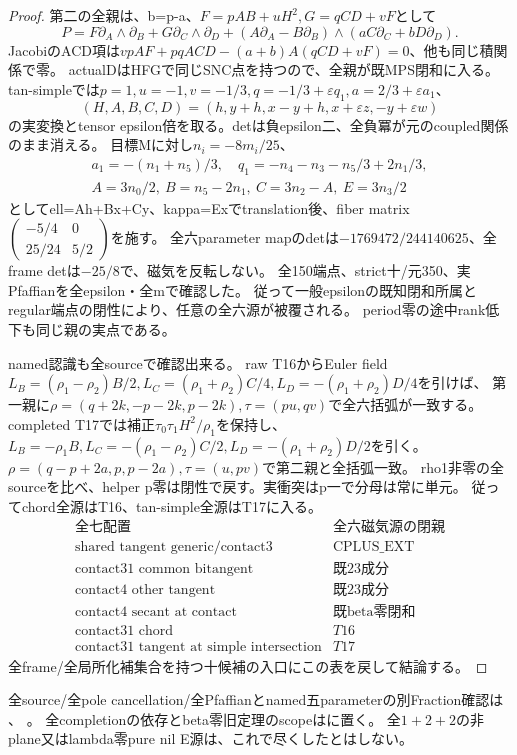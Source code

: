 \documentclass[a4paper,11pt]{ltjsarticle}
\theoremstyle{definition}
\begin{document}
\begin{proof}
第二の全親は、b=p-a、$F=pAB+uH^2,G=qCD+vF$として
\[
 P=F\partial_A\wedge\partial_B+G\partial_C\wedge\partial_D+
 (A\partial_A-B\partial_B)\wedge(aC\partial_C+bD\partial_D).
\]
JacobiのACD項は$vpAF+pqACD-(a+b)A(qCD+vF)=0$、他も同じ積関係で零。
actualDはHFGで同じSNC点を持つので、全親が既MPS閉和に入る。
tan-simpleでは$p=1,u=-1,v=-1/3,q=-1/3+\varepsilon q_1,a=2/3+\varepsilon a_1$、
\[
 (H,A,B,C,D)=(h,y+h,x-y+h,x+\varepsilon z,-y+\varepsilon w)
\]
の実変換とtensor epsilon倍を取る。detは負epsilon二、全負冪が元のcoupled関係のまま消える。
目標Mに対し$n_i=-8m_i/25$、
\[
\begin{gathered}
 a_1=-(n_1+n_5)/3,\quad q_1=-n_4-n_3-n_5/3+2n_1/3,\\
 A=3n_0/2,\ B=n_5-2n_1,\ C=3n_2-A,\ E=3n_3/2
\end{gathered}
\]
としてell=Ah+Bx+Cy、kappa=Exでtranslation後、fiber matrix
$\left(\begin{smallmatrix}-5/4&0\\25/24&5/2\end{smallmatrix}\right)$を施す。
全六parameter mapのdetは$-1769472/244140625$、全frame detは$-25/8$で、磁気を反転しない。
全150端点、strict十/元350、実Pfaffianを全epsilon・全mで確認した。
従って一般epsilonの既知閉和所属とregular端点の閉性により、任意の全六源が被覆される。
period零の途中rank低下も同じ親の実点である。

named認識も全sourceで確認出来る。
raw T16からEuler field
$L_B=(\rho_1-\rho_2)B/2,L_C=(\rho_1+\rho_2)C/4,L_D=-(\rho_1+\rho_2)D/4$を引けば、
第一親に$\rho=(q+2k,-p-2k,p-2k),\tau=(pu,qv)$で全六括弧が一致する。
completed T17では補正$\tau_0\tau_1H^2/\rho_1$を保持し、
$L_B=-\rho_1B,L_C=-(\rho_1-\rho_2)C/2,L_D=-(\rho_1+\rho_2)D/2$を引く。
$\rho=(q-p+2a,p,p-2a),\tau=(u,pv)$で第二親と全括弧一致。
rho1非零の全sourceを比べ、helper p零は閉性で戻す。実衝突はp一で分母は常に単元。
従ってchord全源はT16、tan-simple全源はT17に入る。
\[
\begin{array}{c|c}
 \text{全七配置}&\text{全六磁気源の閉親}\\\hline
 \text{shared tangent generic/contact3}&\text{CPLUS\_EXT}\\
 \text{contact31 common bitangent}&\text{既23成分}\\
 \text{contact4 other tangent}&\text{既23成分}\\
 \text{contact4 secant at contact}&\text{既beta零閉和}\\
 \text{contact31 chord}&T16\\
 \text{contact31 tangent at simple intersection}&T17
\end{array}
\]
全frame/全局所化補集合を持つ十候補の入口にこの表を戻して結論する。
\end{proof}
全source/全pole cancellation/全Pfaffianとnamed五parameterの別Fraction確認は
、
。
全completionの依存とbeta零旧定理のscopeはに置く。
全$1+2+2$の非plane又はlambda零pure nil E源は、これで尽くしたとはしない。
\end{document}
